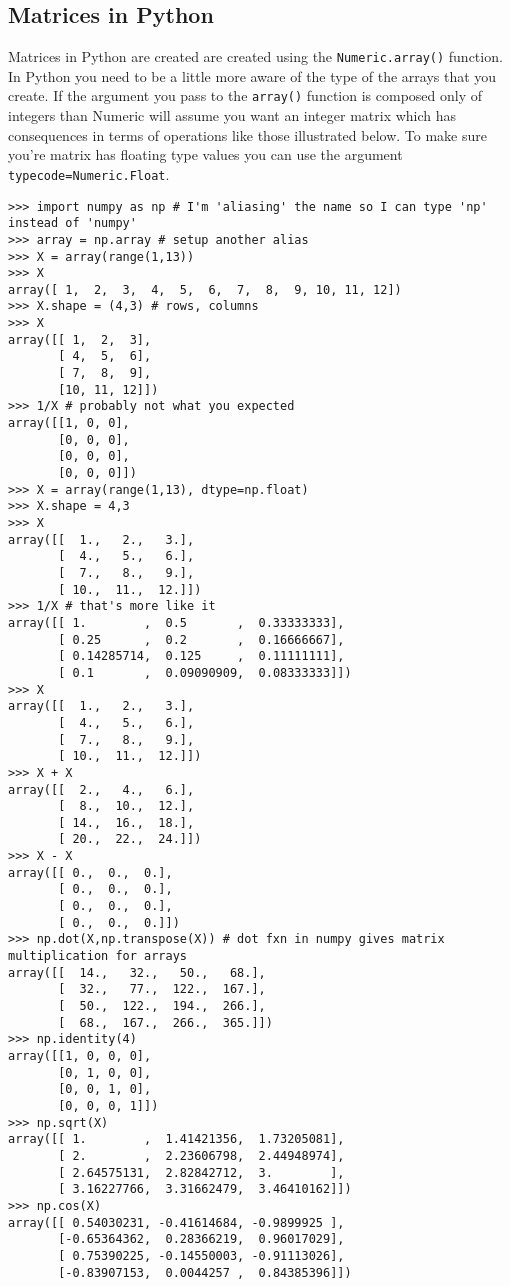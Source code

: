 \subsection{Matrices in Python}

Matrices in Python are created are created using the
\lstinline!Numeric.array()! function. In Python you need to be a little
more aware of the type of the arrays that you create. If the argument
you pass to the \lstinline!array()! function is composed only of
integers than Numeric will assume you want an integer matrix which has
consequences in terms of operations like those illustrated below. To
make sure you're matrix has floating type values you can use the
argument \lstinline!typecode=Numeric.Float!.

\begin{lstlisting}
>>> import numpy as np # I'm 'aliasing' the name so I can type 'np' instead of 'numpy'
>>> array = np.array # setup another alias
>>> X = array(range(1,13))
>>> X
array([ 1,  2,  3,  4,  5,  6,  7,  8,  9, 10, 11, 12])
>>> X.shape = (4,3) # rows, columns
>>> X
array([[ 1,  2,  3],
       [ 4,  5,  6],
       [ 7,  8,  9],
       [10, 11, 12]])
>>> 1/X # probably not what you expected
array([[1, 0, 0],
       [0, 0, 0],
       [0, 0, 0],
       [0, 0, 0]])
>>> X = array(range(1,13), dtype=np.float)
>>> X.shape = 4,3
>>> X
array([[  1.,   2.,   3.],
       [  4.,   5.,   6.],
       [  7.,   8.,   9.],
       [ 10.,  11.,  12.]])
>>> 1/X # that's more like it
array([[ 1.        ,  0.5       ,  0.33333333],
       [ 0.25      ,  0.2       ,  0.16666667],
       [ 0.14285714,  0.125     ,  0.11111111],
       [ 0.1       ,  0.09090909,  0.08333333]])
>>> X
array([[  1.,   2.,   3.],
       [  4.,   5.,   6.],
       [  7.,   8.,   9.],
       [ 10.,  11.,  12.]])
>>> X + X
array([[  2.,   4.,   6.],
       [  8.,  10.,  12.],
       [ 14.,  16.,  18.],
       [ 20.,  22.,  24.]])
>>> X - X
array([[ 0.,  0.,  0.],
       [ 0.,  0.,  0.],
       [ 0.,  0.,  0.],
       [ 0.,  0.,  0.]])
>>> np.dot(X,np.transpose(X)) # dot fxn in numpy gives matrix multiplication for arrays
array([[  14.,   32.,   50.,   68.],
       [  32.,   77.,  122.,  167.],
       [  50.,  122.,  194.,  266.],
       [  68.,  167.,  266.,  365.]])
>>> np.identity(4)
array([[1, 0, 0, 0],
       [0, 1, 0, 0],
       [0, 0, 1, 0],
       [0, 0, 0, 1]])
>>> np.sqrt(X)
array([[ 1.        ,  1.41421356,  1.73205081],
       [ 2.        ,  2.23606798,  2.44948974],
       [ 2.64575131,  2.82842712,  3.        ],
       [ 3.16227766,  3.31662479,  3.46410162]])
>>> np.cos(X)
array([[ 0.54030231, -0.41614684, -0.9899925 ],
       [-0.65364362,  0.28366219,  0.96017029],
       [ 0.75390225, -0.14550003, -0.91113026],
       [-0.83907153,  0.0044257 ,  0.84385396]])
\end{lstlisting}

